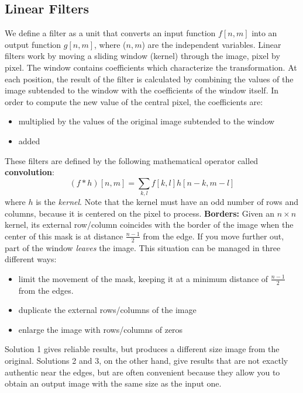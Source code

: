 \subsection{Linear Filters}
We define a filter as a unit that converts an input function $f[n,m]$ into an output function $g[n,m]$, where ($n,m$) are the independent variables. \newline
Linear filters work by moving a sliding window (kernel) through the image, pixel by pixel. The window contains coefficients which characterize the transformation. At each position, the result of the filter is calculated by combining the values of the image subtended to the window with the coefficients of the window itself. In order to compute the new value of the central pixel, the coefficients are:
\begin{itemize}
    \item multiplied by the values of the original image subtended to the window
    \item added
\end{itemize}
These filters are defined by the following mathematical operator called \textbf{convolution}:
\[(f * h)[n,m] = \sum_{k,l}f[k,l]h[n-k, m-l]\]
where $h$ is the \textit{kernel}.\newline
Note that the kernel must have an odd number of rows and columns, because it is centered on the pixel to process.\newline \newline
\textbf{Borders:}\newline
Given an $n \times n$ kernel, its external row/column coincides with the border of the image when the center of this mask is at distance $\frac{n-1}{2}$ from the edge. If you move further out, part of the window \textit{leaves} the image.\newline
This situation can be managed in three different ways:
\begin{itemize}
    \item limit the movement of the mask, keeping it at a minimum distance of $\frac{n-1}{2}$ from the edges.
    \item duplicate the external rows/columns of the image
    \item enlarge the image with rows/columns of zeros
\end{itemize}
Solution 1 gives reliable results, but produces a different size image from the original. Solutions 2 and 3, on the other hand, give results that are not exactly authentic near the edges, but are often convenient because they allow you to obtain an output image with the same size as the input one.

